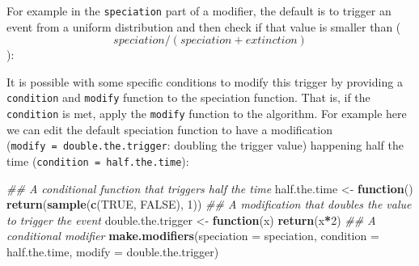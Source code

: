 \documentclass[
]{book}
\newenvironment{Shaded}{\begin{snugshade}}{\end{snugshade}}
\newcommand{\CommentTok}[1]{\textcolor[rgb]{0.56,0.35,0.01}{\textit{#1}}}
\newcommand{\ControlFlowTok}[1]{\textcolor[rgb]{0.13,0.29,0.53}{\textbf{#1}}}
\newcommand{\DataTypeTok}[1]{\textcolor[rgb]{0.13,0.29,0.53}{#1}}
\newcommand{\DecValTok}[1]{\textcolor[rgb]{0.00,0.00,0.81}{#1}}
\newcommand{\KeywordTok}[1]{\textcolor[rgb]{0.13,0.29,0.53}{\textbf{#1}}}
\newcommand{\NormalTok}[1]{#1}
\newcommand{\OperatorTok}[1]{\textcolor[rgb]{0.81,0.36,0.00}{\textbf{#1}}}
\newcommand{\OtherTok}[1]{\textcolor[rgb]{0.56,0.35,0.01}{#1}}
\newcommand{\StringTok}[1]{\textcolor[rgb]{0.31,0.60,0.02}{#1}}
\begin{document}
For example in the \texttt{speciation} part of a modifier, the default is to trigger an event from a uniform distribution and then check if that value is smaller than (\[speciation/(speciation + extinction)\]):

\begin{Shaded}
\end{Shaded}

It is possible with some specific conditions to modify this trigger by providing a \texttt{condition} and \texttt{modify} function to the speciation function.
That is, if the \texttt{condition} is met, apply the \texttt{modify} function to the algorithm.
For example here we can edit the default speciation function to have a modification (\texttt{modify\ =\ double.the.trigger}: doubling the trigger value) happening half the time (\texttt{condition\ =\ half.the.time}):

\begin{Shaded}
\begin{Highlighting}[]
\CommentTok{\#\# A conditional function that triggers half the time}
\NormalTok{half.the.time \textless{}{-}}\StringTok{ }\ControlFlowTok{function}\NormalTok{() }\KeywordTok{return}\NormalTok{(}\KeywordTok{sample}\NormalTok{(}\KeywordTok{c}\NormalTok{(}\OtherTok{TRUE}\NormalTok{, }\OtherTok{FALSE}\NormalTok{), }\DecValTok{1}\NormalTok{))}
\CommentTok{\#\# A modification that doubles the value to trigger the event}
\NormalTok{double.the.trigger \textless{}{-}}\StringTok{ }\ControlFlowTok{function}\NormalTok{(x) }\KeywordTok{return}\NormalTok{(x}\OperatorTok{*}\DecValTok{2}\NormalTok{)}
\CommentTok{\#\# A conditional modifier}
\KeywordTok{make.modifiers}\NormalTok{(}\DataTypeTok{speciation =}\NormalTok{ speciation,}
               \DataTypeTok{condition  =}\NormalTok{ half.the.time, }
               \DataTypeTok{modify =}\NormalTok{ double.the.trigger)}
\end{Highlighting}
\end{Shaded}
\end{document}
